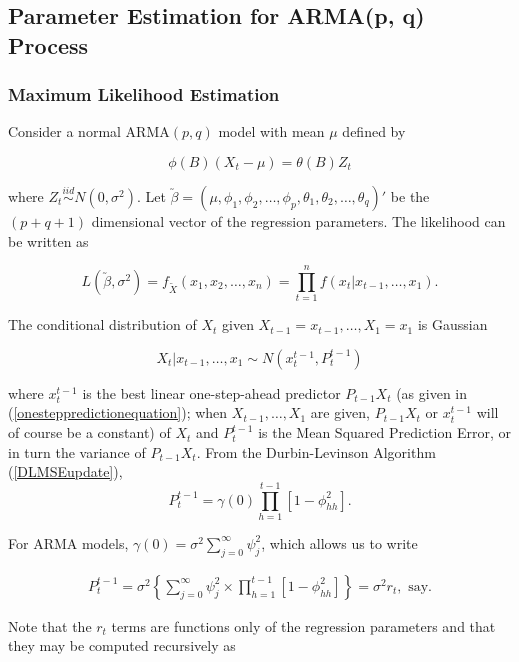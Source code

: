 \documentclass[11pt, a4paper]{article}
\numberwithin{equation}{section}
\theoremstyle{definition}
\begin{document}
\subsection{Parameter Estimation for ARMA(p, q) Process}

\subsubsection{Maximum Likelihood Estimation}

Consider a normal ARMA$(p, q)$ model with mean $\mu$ defined by

\begin{equation}
\phi(B)(X_t - \mu) = \theta(B)Z_t
\end{equation}

where $Z_t \overset{iid}{\sim} N(0, \sigma^2)$. Let $\utilde{\beta} = \left( \mu, \phi_1, \phi_2, \ldots, \phi_p, \theta_1, \theta_2, \ldots, \theta_q \right)'$ be the $(p + q + 1)$ dimensional vector of the regression parameters. The likelihood can be written as 

\begin{equation}
L(\utilde{\beta}, \sigma^2) = f_{\utilde{X}} (x_1, x_2, \ldots, x_n) = \prod \limits_{t = 1}^{n} f(x_t | x_{t-1}, \ldots, x_1).
\end{equation}

The conditional distribution of $X_t$ given $X_{t-1} = x_{t-1}, \ldots, X_1 = x_1$ is Gaussian

$$X_t | x_{t-1}, \ldots, x_1 \sim N(x_t^{t-1}, P_t^{t-1})$$

where $x_t^{t-1}$ is the best linear one-step-ahead predictor $P_{t-1}X_t$ (as given in (\ref{onesteppredictionequation}); when $X_{t-1}, \ldots, X_1$ are given, $P_{t-1}X_t$ or $x_t^{t-1}$ will of course be a constant) of $X_t$ and $P_t^{t-1}$ is the Mean Squared Prediction Error, or in turn the variance of $P_{t-1}X_t$. From the Durbin-Levinson Algorithm (\ref{DLMSEupdate}), $$P_t^{t-1} = \gamma(0) \prod \limits_{h = 1}^{t-1} \left[ 1 - \phi_{hh}^2 \right].$$

For ARMA models, $\gamma(0) = \sigma^2 \sum \limits_{j = 0}^{\infty} \psi_j^2$, which allows us to write

\begin{align}
P_t^{t-1} = \sigma^2 \left\{ \sum \limits_{j = 0}^{\infty} \psi_j^2 \times \prod \limits_{h = 1}^{t-1} \left[ 1 - \phi_{hh}^2 \right] \right\} = \sigma^2 r_t, \text{ say.}
\end{align}

Note that the $r_t$ terms are functions only of the regression parameters and that they may be computed recursively as
\end{document}
